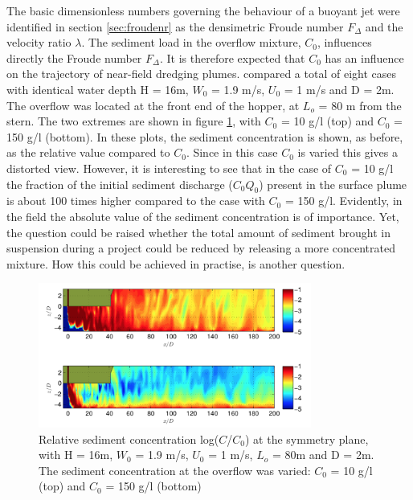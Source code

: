 The basic dimensionless numbers governing the behaviour of a buoyant jet were identified in section \ref{sec:froudenr} as the densimetric Froude number $F_{\Delta}$ and the velocity ratio $\lambda$. The sediment load in the overflow mixture, $C_0$, influences directly the Froude number $F_{\Delta}$. It is therefore expected that $C_0$ has an influence on the trajectory of near-field dredging plumes. \newline
\noindent \cite{Decrop} compared a total of eight cases with identical water depth H = 16m, $W_0$ = 1.9 m/s, $U_0$ = 1 m/s and D = 2m. The overflow was located at the front end of the hopper, at $L_o$ = 80 m from the stern. The two extremes are shown in figure \ref{fig:Sediment_load}, with $C_0$ = 10 g/l (top) and $C_0$ = 150 g/l (bottom). In these plots, the sediment concentration is shown, as before, as the relative value compared to $C_0$. Since in this case $C_0$ is varied this gives a distorted view. However, it is interesting to see that in the case of $C_0$ = 10 g/l the fraction of the initial sediment discharge ($C_0 Q_0$) present in the surface plume is about 100 times higher compared to the case with $C_0$ = 150 g/l. Evidently, in the field the absolute value of the sediment concentration is of importance. Yet, the question could be raised whether the total amount of sediment brought in suspension during a project could be reduced by releasing a more concentrated mixture. How this could be achieved in practise, is another question.

\begin{figure}[ht!]
    \centering
    \includegraphics[width = 0.8\textwidth]{Images/Sediment_load.png}
    \caption{Relative sediment concentration log($C$/$C_0$) at the symmetry plane, with H = 16m, $W_0$ = 1.9 m/s, $U_0$ = 1 m/s, $L_o$ = 80m and D = 2m. The sediment concentration at the overflow was varied: $C_0$ = 10 g/l (top) and $C_0$ = 150 g/l (bottom)}
    \label{fig:Sediment_load}
\end{figure}

